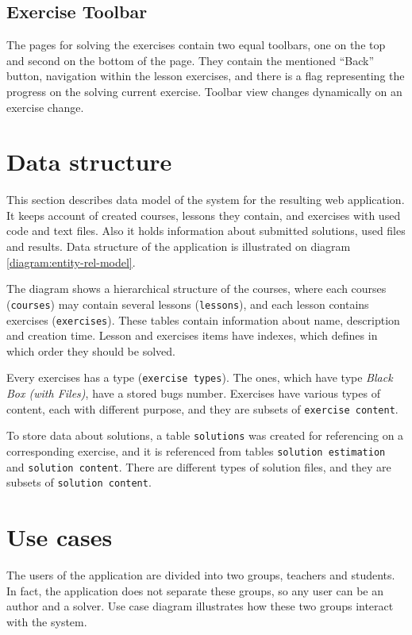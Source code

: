         \subsection{Exercise Toolbar}
        The pages for solving the exercises contain two equal toolbars, one on the top and second on the bottom of the page. They contain the mentioned ``Back'' button, navigation within the lesson exercises, and there is a flag representing the progress on the solving current exercise. Toolbar view changes dynamically on an exercise change.
    
    
    \section{Data structure}
    This section describes data model of the system for the resulting web application. It keeps account of created courses, lessons they contain, and exercises with used code and text files. Also it holds information about submitted solutions, used files and results. Data structure of the application is illustrated on diagram \ref{diagram:entity-rel-model}.

    The diagram shows a hierarchical structure of the courses, where each courses (\texttt{courses}) may contain several lessons (\texttt{lessons}), and each lesson contains exercises (\texttt{exercises}). These tables contain information about name, description and creation time. Lesson and exercises items have indexes, which defines in which order they should be solved.
    
    Every exercises has a type (\texttt{exercise types}). The ones, which have type \textit{Black Box (with Files)}, have a stored bugs number. Exercises have various types of content, each with different purpose, and they are subsets of \texttt{exercise content}.
    
    To store data about solutions, a table \texttt{solutions} was created for referencing on a corresponding exercise, and it is referenced from tables \texttt{solution estimation} and \texttt{solution content}. There are different types of solution files, and they are subsets of \texttt{solution content}.

    
    

    \section{Use cases}
    The users of the application are divided into two groups, teachers and students. In fact, the application does not separate these groups, so any user can be an author and a solver. Use case diagram illustrates how these two groups interact with the system.
    
